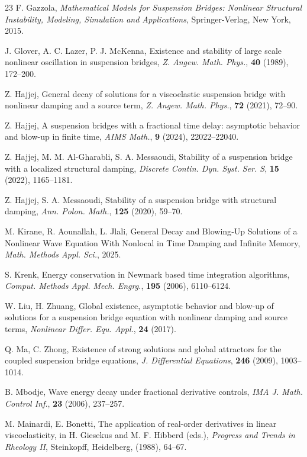 \documentclass[12pt]{article}
\numberwithin{equation}{section}
\begin{document}
\begin{thebibliography}{23}
F. Gazzola, {\em Mathematical Models for Suspension Bridges: Nonlinear Structural Instability, Modeling, Simulation and Applications}, Springer-Verlag, New York, 2015.

J. Glover, A. C. Lazer, P. J. McKenna, Existence and stability of large scale nonlinear oscillation in suspension bridges, {\it Z. Angew. Math. Phys.}, \textbf{40} (1989), 172--200.

Z. Hajjej, General decay of solutions for a viscoelastic suspension bridge with nonlinear damping and a source term, {\it Z. Angew. Math. Phys.}, \textbf{72} (2021), 72--90.

Z. Hajjej, A suspension bridges with a fractional time delay: asymptotic behavior and blow-up in finite time, {\it AIMS Math.}, \textbf{9} (2024), 22022--22040.

Z. Hajjej, M. M. Al-Gharabli, S. A. Messaoudi, Stability of a suspension bridge with a localized structural damping, {\it Discrete Contin. Dyn. Syst. Ser. S}, \textbf{15} (2022), 1165--1181.

Z. Hajjej, S. A. Messaoudi, Stability of a suspension bridge with structural damping, {\it Ann. Polon. Math.}, \textbf{125} (2020), 59--70.

M. Kirane, R. Aounallah, L. Jlali, General Decay and Blowing‐Up Solutions of a Nonlinear Wave Equation With Nonlocal in Time Damping and Infinite Memory, {\it Math. Methods Appl. Sci.}, 2025.

S. Krenk, Energy conservation in Newmark based time integration algorithms, {\it Comput. Methods Appl. Mech. Engrg.}, \textbf{195} (2006), 6110--6124.



W. Liu, H. Zhuang, Global existence, asymptotic behavior and blow-up of solutions for a suspension bridge equation with nonlinear damping and source terms, {\it Nonlinear Differ. Equ. Appl.}, \textbf{24} (2017).

Q. Ma, C. Zhong, Existence of strong solutions and global attractors for the coupled suspension bridge equations, {\it J. Differential Equations}, \textbf{246} (2009), 1003--1014.

B. Mbodje, Wave energy decay under fractional derivative controls, {\it IMA J. Math. Control Inf.}, \textbf{23} (2006), 237--257.

M. Mainardi, E. Bonetti, The application of real-order derivatives in linear viscoelasticity, in H. Giesekus and M. F. Hibberd (eds.), {\it Progress and Trends in Rheology II}, Steinkopff, Heidelberg, (1988), 64--67.


\end{thebibliography}
\end{document}
